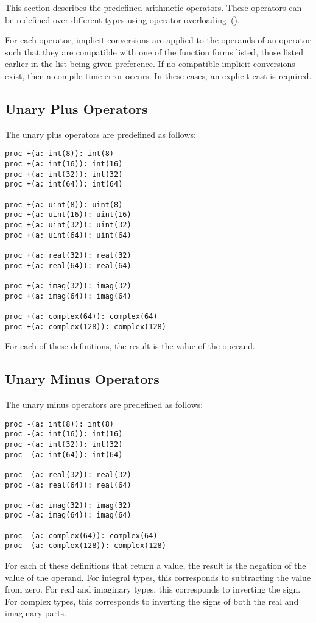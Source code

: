 This section describes the predefined arithmetic operators.  These
operators can be redefined over different types using operator
overloading~().

For each operator, implicit conversions are applied to the operands of
an operator such that they are compatible with one of the function
forms listed, those listed earlier in the list being given
preference.  If no compatible implicit conversions exist, then a
compile-time error occurs.  In these cases, an explicit cast is required.

\pagebreak
\subsection{Unary Plus Operators}
\label{Unary_Plus_Operators}

The unary plus operators are predefined as follows:
\begin{chapel}
\begin{verbatim}
proc +(a: int(8)): int(8)
proc +(a: int(16)): int(16)
proc +(a: int(32)): int(32)
proc +(a: int(64)): int(64)

proc +(a: uint(8)): uint(8)
proc +(a: uint(16)): uint(16)
proc +(a: uint(32)): uint(32)
proc +(a: uint(64)): uint(64)

proc +(a: real(32)): real(32)
proc +(a: real(64)): real(64)

proc +(a: imag(32)): imag(32)
proc +(a: imag(64)): imag(64)

proc +(a: complex(64)): complex(64)
proc +(a: complex(128)): complex(128)
\end{verbatim}
\end{chapel}
For each of these definitions, the result is the value of the operand.

\subsection{Unary Minus Operators}
\label{Unary_Minus_Operators}

The unary minus operators are predefined as follows:
\begin{chapel}
\begin{verbatim}
proc -(a: int(8)): int(8)
proc -(a: int(16)): int(16)
proc -(a: int(32)): int(32)
proc -(a: int(64)): int(64)

proc -(a: real(32)): real(32)
proc -(a: real(64)): real(64)

proc -(a: imag(32)): imag(32)
proc -(a: imag(64)): imag(64)

proc -(a: complex(64)): complex(64)
proc -(a: complex(128)): complex(128)
\end{verbatim}
\end{chapel}
For each of these definitions that return a value, the result is the
negation of the value of the operand.  For integral types, this
corresponds to subtracting the value from zero.  For real and
imaginary types, this corresponds to inverting the sign.  For complex
types, this corresponds to inverting the signs of both the real and
imaginary parts.

